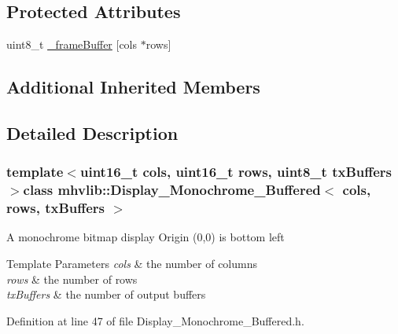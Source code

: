 \subsection*{Protected Attributes}
\begin{DoxyCompactItemize}
\item 
uint8\-\_\-t \hyperlink{classmhvlib_1_1_display___monochrome___buffered_a1cf336fb0da55e705f4fb9efb5543c7c}{\-\_\-frame\-Buffer} \mbox{[}cols $\ast$rows\mbox{]}
\end{DoxyCompactItemize}
\subsection*{Additional Inherited Members}


\subsection{Detailed Description}
\subsubsection*{template$<$uint16\-\_\-t cols, uint16\-\_\-t rows, uint8\-\_\-t tx\-Buffers$>$class mhvlib\-::\-Display\-\_\-\-Monochrome\-\_\-\-Buffered$<$ cols, rows, tx\-Buffers $>$}

A monochrome bitmap display Origin (0,0) is bottom left 
\begin{DoxyTemplParams}{Template Parameters}
{\em cols} & the number of columns \\
\hline
{\em rows} & the number of rows \\
\hline
{\em tx\-Buffers} & the number of output buffers \\
\hline
\end{DoxyTemplParams}


Definition at line 47 of file Display\-\_\-\-Monochrome\-\_\-\-Buffered.\-h.



